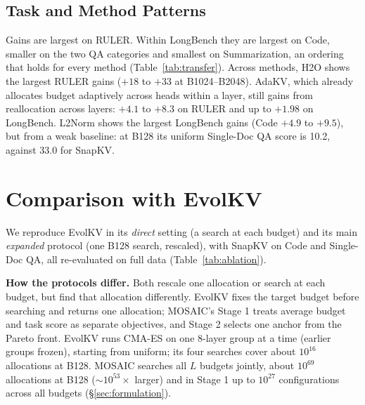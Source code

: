 \documentclass[11pt]{article}
\begin{document}
\subsection{Task and Method Patterns}

Gains are largest on RULER. Within LongBench they are largest on Code, smaller on the two QA categories and smallest on Summarization, an ordering that holds for every method (Table~\ref{tab:transfer}). Across methods, H2O shows the largest RULER gains ($+18$ to $+33$ at B1024--B2048). AdaKV, which already allocates budget adaptively across heads within a layer, still gains from reallocation across layers: $+4.1$ to $+8.3$ on RULER and up to $+1.98$ on LongBench. L2Norm shows the largest LongBench gains (Code $+4.9$ to $+9.5$), but from a weak baseline: at B128 its uniform Single-Doc QA score is 10.2, against 33.0 for SnapKV.

\section{Comparison with EvolKV}
\label{sec:evolkv}

We reproduce EvolKV \citep{yu2025evolkv} in its \emph{direct} setting (a search at each budget) and its main \emph{expanded} protocol (one B128 search, rescaled), with SnapKV on Code and Single-Doc QA, all re-evaluated on full data (Table~\ref{tab:ablation}).

\textbf{How the protocols differ.} Both rescale one allocation or search at each budget, but find that allocation differently. EvolKV fixes the target budget before searching and returns one allocation; MOSAIC's Stage 1 treats average budget and task score as separate objectives, and Stage 2 selects one anchor from the Pareto front. EvolKV runs CMA-ES on one 8-layer group at a time (earlier groups frozen), starting from uniform; its four searches cover about $10^{16}$ allocations at B128. MOSAIC searches all $L$ budgets jointly, about $10^{69}$ allocations at B128 (${\sim}10^{53}\times$ larger) and in Stage 1 up to $10^{27}$ configurations across all budgets (\S\ref{sec:formulation}).
\end{document}
